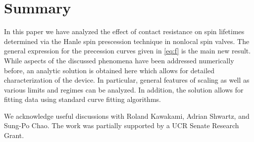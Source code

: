 \section{Summary}
\label{s:summary}

In this paper we have analyzed the effect of contact resistance
on spin lifetimes determined via the Hanle spin prescession technique in nonlocal spin valves.
The general expression for the precession curves given in \cref{eq:f} is the main new result.
While aspects of the discussed phenomena have been addressed numerically before,
an analytic solution is obtained here which allows for detailed characterization of the device.
In particular, general features of scaling as well as various limits and regimes can be analyzed.
In addition, the solution allows for fitting data using standard curve fitting algorithms.

\begin{acknowledgments}
  We acknowledge useful discussions with Roland Kawakami, Adrian Shwartz, and Sung-Po Chao.
  The work was partially supported by a UCR Senate Research Grant.
\end{acknowledgments}

